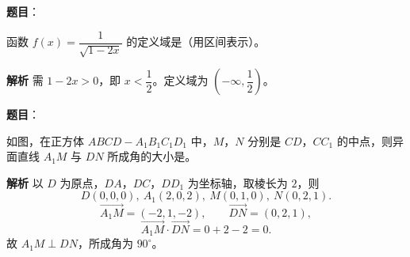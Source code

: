 \begin{answer}

\textbf{题目}：

函数 $f(x)=\dfrac1{\sqrt{1-2x}}$ 的定义域是\gkblank{}（用区间表示）。

\textbf{解析}
需 $1-2x>0$，即 $x<\dfrac12$。定义域为 $\left(-\infty,\dfrac12\right)$。


\end{answer}
\begin{answer}

\textbf{题目}：

如图，在正方体 $ABCD-A_1B_1C_1D_1$ 中，$M$，$N$ 分别是 $CD$，$CC_1$ 的中点，则异面直线 $A_1M$ 与 $DN$ 所成角的大小是\gkblank{}。
\nopagebreak[4]
\begin{center}\end{center}
\nopagebreak[4]
\textbf{解析}
以 $D$ 为原点，$DA$，$DC$，$DD_1$ 为坐标轴，取棱长为 $2$，则
\nopagebreak[4]
\[D(0,0,0),\ A_1(2,0,2),\ M(0,1,0),\ N(0,2,1).\]
\nopagebreak[4]
\[\overrightarrow{A_1M}=(-2,1,-2),\qquad \overrightarrow{DN}=(0,2,1),\]
\nopagebreak[4]
\[\overrightarrow{A_1M}\cdot\overrightarrow{DN}=0+2-2=0.\]
故 $A_1M\perp DN$，所成角为 $90^\circ$。


\end{answer}
